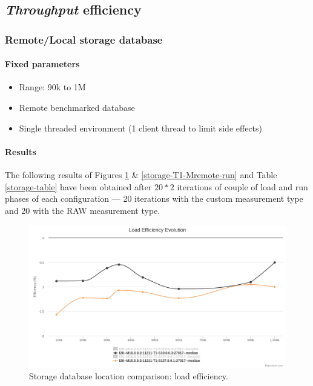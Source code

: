 \documentclass[a4paper,11pt]{report}
\begin{document}
\subsection{\textit{Throughput} efficiency}

\subsubsection{Remote/Local storage database}

\paragraph{Fixed parameters}
\begin{itemize}
\item
Range: 90k to 1M
\item
Remote benchmarked database
\item
Single threaded environment (1 client thread to limit side effects)
\end{itemize}

\paragraph{Results}

The following results of Figures \ref{storage-T1-Mremote-load}  \& \ref{storage-T1-Mremote-run} and Table \ref{storage-table} have been obtained after $20*2$ iterations of couple of load and run phases of each configuration --- 20 iterations with the custom measurement type and 20 with the RAW measurement type.

\begin{figure}[ht]
\begin{center}
\includegraphics[width=1\linewidth]{images/evaluation/storage-T1-Mremote-load.png}
\caption{Storage database location comparison: load efficiency.}
\label{storage-T1-Mremote-load}
\end{center}
\end{figure}
\end{document}

